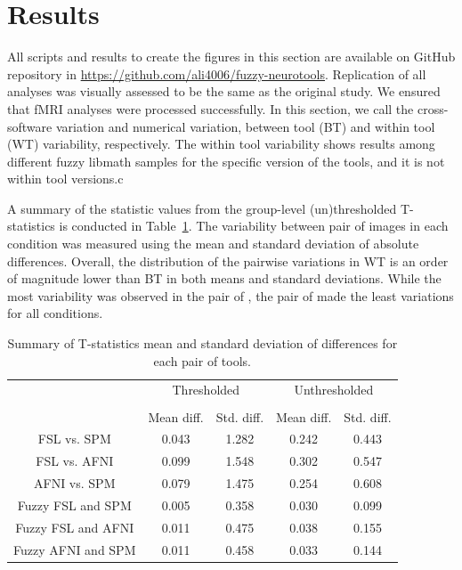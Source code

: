 \documentclass[conference]{IEEEtran}
\begin{document}
\section{Results}
All scripts and results to create the figures in this section are available on GitHub repository
in \url{https://github.com/ali4006/fuzzy-neurotools}.
Replication of all analyses was visually assessed to be the same as the original study.
We ensured that fMRI analyses were processed successfully.
In this section, we call the cross-software variation and numerical variation,
between tool (BT) and within tool (WT) variability, respectively. 
The within tool variability shows results among different fuzzy libmath
samples for the specific version of the tools, and it is not within tool versions.c

A summary of the statistic values from the group-level (un)thresholded T-statistics is conducted in
Table~\ref{table:pipeline-stats}.
The variability between pair of images in each condition was measured using the mean and standard deviation of absolute differences.
Overall, the distribution of the pairwise variations in WT is an order of magnitude lower than BT in both means and standard deviations.
While the most variability was observed in the pair of \fslafni, the pair of \fslspm made the least variations for all conditions.


\setlength{\tabcolsep}{5pt}
\begin{table}[h]
    \centering
    \begin{tabular}{ccc|cc}
        \toprule
        \multirow{2}{*}{} & \multicolumn{2}{c}{Thresholded} & \multicolumn{2}{c}{Unthresholded} \\
        \cmidrule{2-3} \cmidrule{4-5} \\
        {} & Mean diff. & Std. diff. & Mean diff. & Std. diff. \\
        \midrule
        \rowcolor{lightgray}
        FSL vs. SPM          &  0.043       & 1.282      & 0.242     & 0.443  \\
        \rowcolor{lightgray}
        FSL vs. AFNI         &  0.099       & 1.548      & 0.302     & 0.547  \\
        \rowcolor{lightgray}
        AFNI vs. SPM         &  0.079       & 1.475      & 0.254     & 0.608  \\
        Fuzzy FSL and SPM    &  0.005       & 0.358      & 0.030     & 0.099  \\
        Fuzzy FSL and AFNI   &  0.011       & 0.475      & 0.038     & 0.155  \\
        Fuzzy AFNI and SPM   &  0.011       & 0.458      & 0.033     & 0.144  \\
        \bottomrule
    \end{tabular}
    \caption{Summary of T-statistics mean and standard deviation of differences for each pair of tools.}
    \label{table:pipeline-stats}
\end{table}
\end{document}
